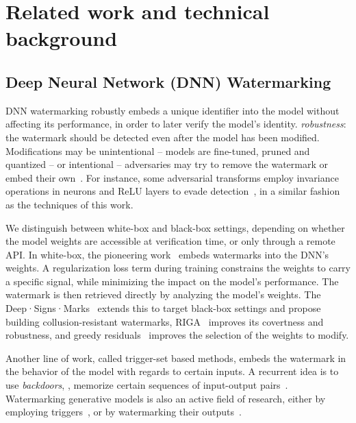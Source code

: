 \newcommand{\att}[1]{\mathrm{Att}^{#1}}
\newcommand{\ffn}[1]{\mathrm{Ffn}^{#1}}
\newcommand{\lnatt}[1]{\mathrm{Ln}_{\mathrm{att}}^{#1}}
\newcommand{\lnffn}[1]{\mathrm{Ln}_{\mathrm{ffn}}^{#1}}
\newcommand{\lnout}{\mathrm{Ln}_{\mathrm{out}}}


\section{Related work and technical background}\label{chap7/sec:related}



\subsection{Deep Neural Network (DNN) Watermarking}\label{chap7/par:watermarking} 

DNN watermarking robustly embeds a unique identifier into the model without affecting its performance, in order to later verify the model's identity.
\textit{robustness}: the watermark should be detected even after the model has been modified.
Modifications may be unintentional -- models are fine-tuned, pruned and quantized
-- or intentional -- adversaries may try to remove the watermark or embed their own~\citep{fan2019rethinking, zhang2020passport, kallas2022rose}.
For instance, some adversarial transforms employ invariance operations in neurons and ReLU layers to evade detection~\citep{yan2023rethinking}, in a similar fashion as the techniques of this work.

We distinguish between white-box and black-box settings, depending on whether the model weights are accessible at verification time, or only through a remote API.
In white-box, the pioneering work~\citep{uchida2017embedding} embeds watermarks into the DNN's weights. 
A regularization loss term during training constrains the weights to carry a specific signal, while minimizing the impact on the model's performance. 
The watermark is then retrieved directly by analyzing the model's weights.
The  Deep·Signs·Marks~\citep{darvish2019deepsigns,chen2019deepmarks} extends this to target black-box settings and propose building collusion-resistant watermarks, 
RIGA~\citep{wang2021riga} improves its covertness and robustness, 
and greedy residuals~\citep{liu2021watermarking} improves the selection of the weights to modify.

Another line of work, called trigger-set based methods, embeds the watermark in the behavior of the model with regards to certain inputs. 
A recurrent idea is to use \emph{backdoors}, \ie, memorize certain sequences of input-output pairs~\citep{adi2018turning, zhang2018protecting}. 
Watermarking generative models is also an active field of research, either by employing triggers~\citep{lim2022protect, ong2021protecting}, or by watermarking their outputs~\citep{fernandez2023stable, kim2023wouaf}.

